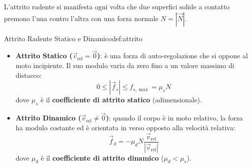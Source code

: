 L'attrito radente si manifesta ogni volta che due superfici solide a contatto premono l'una contro l'altra con una forza normale $N = |\vec{N}|$.

\begin{definizione}{Attrito Radente Statico e Dinamico}{def:attrito}
\begin{itemize}
    \item \textbf{Attrito Statico ($\vec{v}_{\text{rel}} = \vec{0}$)}: è una forza di auto-regolazione che si oppone al moto incipiente. Il suo modulo varia da zero fino a un valore massimo di distacco:
    \begin{equation}
        0 \le |\vec{f}_s| \le f_{s,\max} = \mu_s N
        \label{eq:attrito_statico}
    \end{equation}
    dove $\mu_s$ è il \textbf{coefficiente di attrito statico} (adimensionale).
    \item \textbf{Attrito Dinamico ($\vec{v}_{\text{rel}} \neq \vec{0}$)}: quando il corpo è in moto relativo, la forza ha modulo costante ed è orientata in verso opposto alla velocità relativa:
    \begin{equation}
        \vec{f}_d = -\mu_d N \frac{\vec{v}_{\text{rel}}}{|\vec{v}_{\text{rel}}|}
        \label{eq:attrito_dinamico}
    \end{equation}
    dove $\mu_d$ è il \textbf{coefficiente di attrito dinamico} ($\mu_d < \mu_s$).
\end{itemize}
\end{definizione}

\begin{center}
\end{center}

